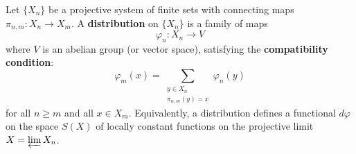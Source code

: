 Let $\{X_n\}$ be a projective system of finite sets with connecting maps $\pi_{n,m}: X_n \to X_m$. A \textbf{distribution} on $\{X_n\}$ is a family of maps
$$\varphi_n : X_n \to V$$
where $V$ is an abelian group (or vector space), satisfying the \textbf{compatibility condition}:
$$\varphi_m(x) = \sum_{\substack{y \in X_n \\ \pi_{n,m}(y) = x}} \varphi_n(y)$$
for all $n \geq m$ and all $x \in X_m$. Equivalently, a distribution defines a functional $d\varphi$ on the space $S(X)$ of locally constant functions on the projective limit $X = \varprojlim X_n$.
